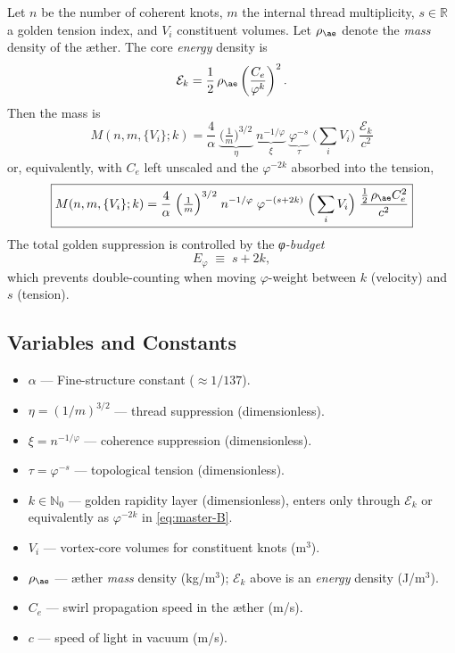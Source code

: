 \documentclass[12pt]{article}
\begin{document}
  Let \(n\) be the number of coherent knots, \(m\) the internal thread multiplicity, \(s\in\mathbb{R}\) a golden tension index, and \(V_i\) constituent volumes. Let \(\rho_{\ae}\) denote the \emph{mass} density of the æther. The core \emph{energy} density is
  \[
      \mathcal{E}_k=\frac{1}{2}\,\rho_{\ae}\left(\frac{C_e}{\varphi^k}\right)^2.
  \]
  Then the mass is
  \begin{equation}
      \boxed{
          M(n,m,\{V_i\};k)=\frac{4}{\alpha}\;
          \underbrace{\Big(\tfrac{1}{m}\Big)^{3/2}}_{\eta}\;
          \underbrace{n^{-1/\varphi}}_{\xi}\;
          \underbrace{\varphi^{-s}}_{\tau}\;
          \Big(\sum_i V_i\Big)\;
          \frac{\mathcal{E}_k}{c^2}
      }
      \label{eq:master-A}
  \end{equation}
  or, equivalently, with \(C_e\) left unscaled and the \(\varphi^{-2k}\) absorbed into the tension,
  \begin{equation}
      \boxed{
          M(n,m,\{V_i\};k)=\frac{4}{\alpha}\;
          \Big(\tfrac{1}{m}\Big)^{3/2}\;
          n^{-1/\varphi}\;
          \varphi^{-(s+2k)}\;
          \Big(\sum_i V_i\Big)\;
          \frac{\tfrac12\,\rho_{\ae} C_e^2}{c^2}
      }
      \label{eq:master-B}
  \end{equation}
  The total golden suppression is controlled by the \emph{φ-budget}
  \begin{equation}
      E_{\varphi}\;\equiv\;s+2k,
  \end{equation}
  which prevents double-counting when moving \(\varphi\)-weight between \(k\) (velocity) and \(s\) (tension).

  \subsection*{Variables and Constants}
  \begin{itemize}
      \item \(\alpha\) — Fine-structure constant (\(\approx 1/137\)).
      \item \(\eta=(1/m)^{3/2}\) — thread suppression (dimensionless).
      \item \(\xi=n^{-1/\varphi}\) — coherence suppression (dimensionless).
      \item \(\tau=\varphi^{-s}\) — topological tension (dimensionless).
      \item \(k\in\mathbb{N}_0\) — golden rapidity layer (dimensionless), enters only through \(\mathcal{E}_k\) or equivalently as \(\varphi^{-2k}\) in \eqref{eq:master-B}.
      \item \(V_i\) — vortex‐core volumes for constituent knots (m\(^3\)).
      \item \(\rho_{\ae}\) — æther \emph{mass} density (kg/m\(^3\)); \(\mathcal{E}_k\) above is an \emph{energy} density (J/m\(^3\)).
      \item \(C_e\) — swirl propagation speed in the æther (m/s).
      \item \(c\) — speed of light in vacuum (m/s).
  \end{itemize}
\end{document}
